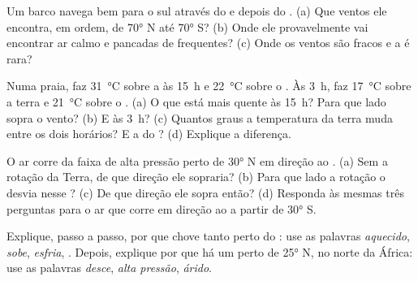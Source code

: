 \begin{exercise}[$\star\star$]\label{exo:g8:winds-global-circulation:6}
Um barco navega bem para o sul através do  e depois do
. (a) Que ventos ele encontra, em ordem, de \ang{70} N até
\ang{70} S? (b) Onde ele provavelmente vai encontrar ar calmo e pancadas de
 frequentes? (c) Onde os ventos são fracos e a  é rara?
\end{exercise}

\begin{exercise}[$\star\star$]\label{exo:g8:winds-global-circulation:7}
Numa praia, faz \qty{31}{\degreeCelsius} sobre a  às 15~h e
\qty{22}{\degreeCelsius} sobre o . Às 3~h, faz
\qty{17}{\degreeCelsius} sobre a terra e \qty{21}{\degreeCelsius} sobre o
. (a) O que está mais quente às 15~h? Para que lado sopra o vento?
(b) E às 3~h? (c) Quantos graus a temperatura da terra muda entre os dois
horários? E a do ? (d) Explique a diferença.
\end{exercise}

\begin{exercise}[$\star\star$]\label{exo:g8:winds-global-circulation:8}
O ar corre da faixa de alta pressão perto de \ang{30} N em direção ao
. (a) Sem a rotação da Terra, de que direção ele sopraria? (b) Para
que lado a rotação o desvia nesse ? (c) De que direção ele sopra
então? (d) Responda às mesmas três perguntas para o ar que corre em
direção ao  a partir de \ang{30} S.
\end{exercise}

\begin{exercise}[$\star\star$]\label{exo:g8:winds-global-circulation:9}
Explique, passo a passo, por que chove tanto perto do : use as
palavras \emph{aquecido}, \emph{sobe}, \emph{esfria}, \emph{}.
Depois, explique por que há um  perto de \ang{25} N, no norte da
África: use as palavras \emph{desce}, \emph{alta pressão}, \emph{árido}.
\end{exercise}

